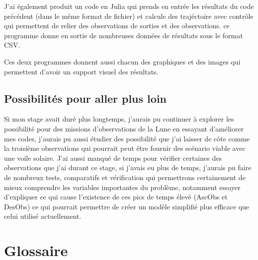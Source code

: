 \documentclass[12pt]{article} %
\begin{document}
		J'ai également produit un code en Julia qui prends en entrée les résultats du code précédent (dans le même format de fichier) et calcule des trajéctoire avec contrôle qui permettent de relier des observations de sorties et des observations. ce programme donne en sortie de nombreuses données de résultats sous le format CSV.
		
		Ces deux programmes donnent aussi chacun des graphiques et des images qui permettent d'avoir un support visuel des résultats.
		
		\subsection{Possibilités pour aller plus loin}
		Si mon stage avait duré plus longtemps, j'aurais pu continuer à explorer les possibilité pour des missions d'observations de la Lune en essayant d'améliorer mes codes, j'aurais pu aussi étudier des possibilité que j'ai laisser de côte comme la troisième observations qui pourrait peut être fournir des scénario viable avec une voile solaire. J'ai aussi manqué de temps pour vérifier certaines des observations que j'ai durant ce stage, si j'avais eu plus de temps, j'aurais pu faire de nombreux tests, comparatifs et vérification qui permettrons certainement de mieux comprendre les variables importantes du problème, notamment essayer d'expliquer ce qui cause l'existence de ces pics de temps élevé (\gls{AscObs} et \gls{DesObs}) ce qui pourrait permettre de créer un modèle simplifié plus efficace que celui utilisé actuellement.
		
		\vfill
		
		\section{Glossaire}
		
		\printglossaries
		
		
		
\end{document}
